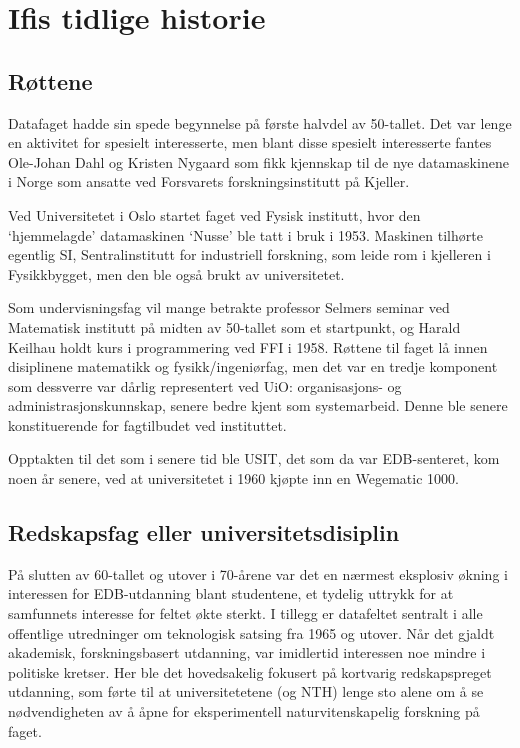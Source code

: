 \chapter{Ifis tidlige historie}

\author{Narve Trædal}

\section{Røttene}

Datafaget hadde sin spede begynnelse på første halvdel av 50-tallet. Det var lenge en  aktivitet for spesielt interesserte, men blant disse spesielt interesserte fantes Ole-Johan Dahl og Kristen Nygaard som fikk kjennskap til de nye datamaskinene i Norge som ansatte ved Forsvarets forskningsinstitutt på Kjeller. 

Ved Universitetet i Oslo startet faget ved Fysisk institutt, hvor den `hjemmelagde' datamaskinen `Nusse' ble tatt i bruk i 1953. Maskinen tilhørte egentlig SI, Sentralinstitutt for industriell forskning, som leide rom i kjelleren i Fysikkbygget, men den ble også brukt av universitetet. 

Som undervisningsfag vil mange betrakte professor Selmers seminar ved Matematisk institutt på midten av 50-tallet som et startpunkt, og Harald Keilhau holdt kurs i programmering ved FFI i 1958. Røttene til faget lå innen disiplinene matematikk og fysikk/ingeniørfag, men det var en tredje komponent som dessverre var dårlig representert ved UiO: organisasjons- og administrasjonskunnskap, senere bedre kjent som systemarbeid. Denne ble senere konstituerende for fagtilbudet ved instituttet. 

Opptakten til det som i senere tid ble USIT, det som da var EDB-senteret, kom noen år senere, ved at universitetet i 1960 kjøpte inn en Wegematic 1000.

\section{Redskapsfag eller universitetsdisiplin}

På slutten av 60-tallet og utover i 70-årene var det en nærmest eksplosiv økning i interessen for EDB-utdanning blant studentene, et tydelig uttrykk for at samfunnets interesse for feltet økte sterkt. I tillegg er datafeltet sentralt i alle offentlige utredninger om teknologisk satsing fra 1965 og utover. Når det gjaldt akademisk, forskningsbasert utdanning, var imidlertid interessen noe mindre i politiske kretser. Her ble det hovedsakelig fokusert på kortvarig redskapspreget utdanning, som førte til at universitetetene (og NTH) lenge sto alene om å se nødvendigheten av å åpne for eksperimentell naturvitenskapelig forskning på faget.

